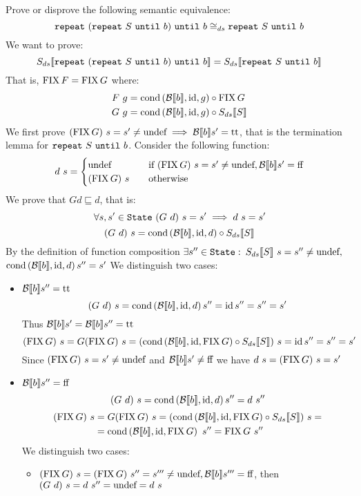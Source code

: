 \begin{exercise}{
    Prove or disprove the following semantic equivalence:
    \[ \wrepeat{(\wrepeat{S}{b})}{b} \DScong \wrepeat{S}{b} \]
}
    We want to prove:
    \[ \Sds{\wrepeat{(\wrepeat{S}{b})}{b}} = \Sds{\wrepeat{S}{b}} \]
    That is, $\FIX F = \FIX G$ where:
    \begin{align*}
        F\ g &= \cond{\Bool{b}}{\id}{g} \circ \FIX G \\
        G\ g &= \cond{\Bool{b}}{\id}{g} \circ \Sds{S}
    \end{align*}
    We first prove $(\FIX G)\ s = s' \neq \undef \implies \Bool{b} s' = \True$, that is the termination lemma for $\wrepeat{S}{b}$.
    Consider the following function:
    \[
        d\ s = \begin{cases}
            \undef &\quad \text{if } (\FIX G)\ s = s' \neq \undef, \Bool{b} s' = \False \\
            (\FIX G)\ s &\quad \text{otherwise}
        \end{cases}
    \]
    We prove that $G d \sqsubseteq d$, that is:
    \[ \forall s, s' \in \State\ (G\ d)\ s = s' \implies d\ s = s' \]
    \[ (G\ d)\ s = \cond{\Bool{b}}{\id}{d} \circ \Sds{S} \]
    By the definition of function composition $\exists s'' \in \State :$ $\Sds{S}\ s = s'' \neq \undef,$ $\cond{\Bool{b}}{\id}{d} s'' = s'$
    We distinguish two cases:
    \begin{itemize}
        \item $\Bool{b} s'' = \True$
            \[ (G\ d)\ s = \cond{\Bool{b}}{\id}{d} s'' = \id s'' = s'' = s' \]
            Thus $\Bool{b} s' = \Bool{b} s'' = \True$
            \[ (\FIX G)\ s = G(\FIX G)\ s = (\cond{\Bool{b}}{\id}{\FIX G} \circ \Sds{S})\ s = \id s'' = s'' = s' \]
            Since $(\FIX G)\ s = s' \neq \undef$ and $\Bool{b} s' \neq \False$ we have $d\ s = (\FIX G)\ s = s'$
        \item $\Bool{b} s'' = \False$
            \[ (G\ d)\ s = \cond{\Bool{b}}{\id}{d} s'' = d\ s'' \]
            \begin{align*}
                (\FIX G)\ s &= G(\FIX G)\ s = (\cond{\Bool{b}}{\id}{\FIX G} \circ \Sds{S})\ s = \\
                &= \cond{\Bool{b}}{\id}{\FIX G}\ s'' = \FIX G\ s''
            \end{align*}
            We distinguish two cases:
            \begin{itemize}
                \item $(\FIX G)\ s = (\FIX G)\ s'' = s''' \neq \undef, \Bool{b} s''' = \False$, then $(G\ d)\ s = d\ s'' = \undef = d\ s$

\end{itemize}
\end{itemize}
\end{exercise}
